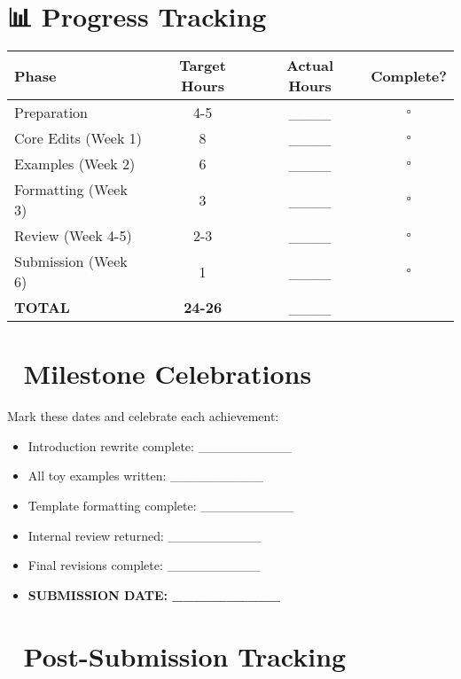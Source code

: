 \documentclass[11pt]{article}
\begin{document}
\section*{📊 Progress Tracking}

\begin{center}
\begin{tabular}{|l|c|c|c|}
\hline
\textbf{Phase} & \textbf{Target Hours} & \textbf{Actual Hours} & \textbf{Complete?} \\
\hline
Preparation & 4-5 & \_\_\_\_ & $\square$ \\
Core Edits (Week 1) & 8 & \_\_\_\_ & $\square$ \\
Examples (Week 2) & 6 & \_\_\_\_ & $\square$ \\
Formatting (Week 3) & 3 & \_\_\_\_ & $\square$ \\
Review (Week 4-5) & 2-3 & \_\_\_\_ & $\square$ \\
Submission (Week 6) & 1 & \_\_\_\_ & $\square$ \\
\hline
\textbf{TOTAL} & \textbf{24-26} & \_\_\_\_  & \\
\hline
\end{tabular}
\end{center}

\section*{🎯 Milestone Celebrations}

Mark these dates and celebrate each achievement:

\begin{itemize}
    \item Introduction rewrite complete: \_\_\_\_\_\_\_\_\_\_
    \item All toy examples written: \_\_\_\_\_\_\_\_\_\_
    \item Template formatting complete: \_\_\_\_\_\_\_\_\_\_
    \item Internal review returned: \_\_\_\_\_\_\_\_\_\_
    \item Final revisions complete: \_\_\_\_\_\_\_\_\_\_
    \item \textbf{SUBMISSION DATE: \_\_\_\_\_\_\_\_\_\_} 🎉
\end{itemize}

\section*{📧 Post-Submission Tracking}
\end{document}
